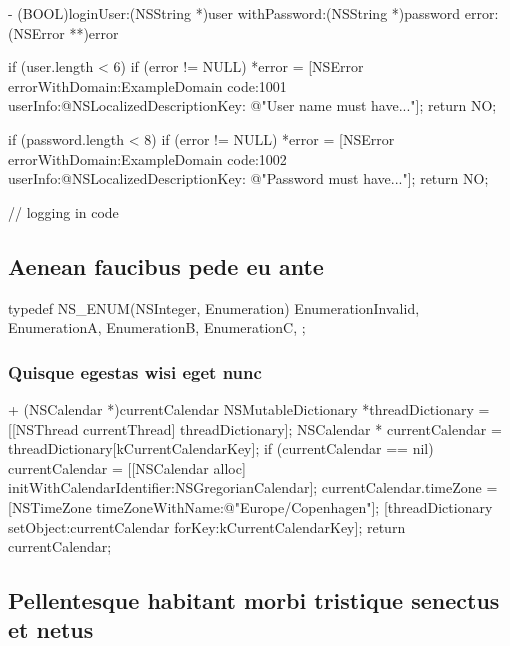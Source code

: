 \documentclass[10pt]{extarticle}
\newenvironment{codelisting}
{\footnotesize\mdframed[middlelinewidth=0.5pt, middlelinecolor=BaliHaiColor, skipabove=15pt]\verbatim}
{\endverbatim\endmdframed\vspace{12pt}\normalsize}
\begin{document}
\begin{codelisting}
- (BOOL)loginUser:(NSString *)user withPassword:(NSString *)password error:(NSError **)error
{
    if (user.length < 6) {
        if (error != NULL)
            *error = [NSError errorWithDomain:ExampleDomain
                                         code:1001
                                     userInfo:@{NSLocalizedDescriptionKey: @"User name must have..."}];
        return NO;
    }
   
    if (password.length < 8)
        if (error != NULL)
            *error = [NSError errorWithDomain:ExampleDomain
                                         code:1002
                                     userInfo:@{NSLocalizedDescriptionKey: @"Password must have..."}];
        return NO;
   
    // logging in code
}
\end{codelisting}

\subsection{Aenean faucibus pede eu ante}

\begin{codelisting}
typedef NS_ENUM(NSInteger, Enumeration) {
    EnumerationInvalid,
    EnumerationA,
    EnumerationB,
    EnumerationC,
};
\end{codelisting}

\subsubsection{Quisque egestas wisi eget nunc}

\begin{codelisting}
+ (NSCalendar *)currentCalendar
{
    NSMutableDictionary *threadDictionary = [[NSThread currentThread] threadDictionary];
    NSCalendar * currentCalendar = threadDictionary[kCurrentCalendarKey];
    if (currentCalendar == nil) {
        currentCalendar = [[NSCalendar alloc] initWithCalendarIdentifier:NSGregorianCalendar];
        currentCalendar.timeZone = [NSTimeZone timeZoneWithName:@"Europe/Copenhagen"];
        [threadDictionary setObject:currentCalendar forKey:kCurrentCalendarKey];
    }
    return currentCalendar;
}
\end{codelisting}

\subsection{Pellentesque habitant morbi tristique senectus et netus}
\end{document}
